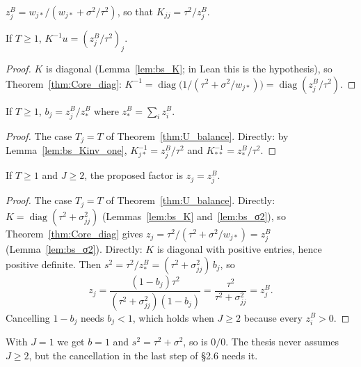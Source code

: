 \begin{definition}\label{def:bsZ}
  \leanok
  $z_j^B = w_{j*}/(w_{j*} + \sigma^2/\tau^2)$, so that
  $K_{jj} = \tau^2/z_j^B$.
\end{definition}

\begin{lemma}\label{lem:bs_Kinv_one}
  \leanok
  If $T \ge 1$, $K^{-1}u = (z_j^B/\tau^2)_j$.
\end{lemma}
\begin{proof}
  \leanok
  $K$ is diagonal (Lemma~\ref{lem:bs_K}; in Lean this is the hypothesis),
  so Theorem~\ref{thm:Core_diag}:
  $K^{-1} = \operatorname{diag}\bigl(1/(\tau^2 + \sigma^2/w_{j*})\bigr)
  = \operatorname{diag}(z_j^B/\tau^2)$.
\end{proof}

\begin{lemma}\label{lem:bs_b}
  \leanok
  If $T \ge 1$, $b_j = z_j^B/z_*^B$ where $z_*^B = \sum_i z_i^B$.
\end{lemma}
\begin{proof}
  \leanok
  The case $T_j = T$ of Theorem~\ref{thm:U_balance}. Directly: by
  Lemma~\ref{lem:bs_Kinv_one}, $K^{-1}_{j*} = z_j^B/\tau^2$
  and $K^{-1}_{**} = z_*^B/\tau^2$.
\end{proof}

\begin{theorem}\label{thm:bs_z}
  \leanok
  If $T \ge 1$ and $J \ge 2$, the proposed factor is $z_j = z_j^B$.
\end{theorem}
\begin{proof}
  \leanok
  The case $T_j = T$ of Theorem~\ref{thm:U_balance}. Directly:
  $K = \operatorname{diag}(\tau^2 + \sigma^2_{jj})$ (Lemmas~\ref{lem:bs_K}
  and~\ref{lem:bs_σ2}), so Theorem~\ref{thm:Core_diag} gives
  $z_j = \tau^2/(\tau^2 + \sigma^2/w_{j*}) = z_j^B$ (Lemma~\ref{lem:bs_σ2}).
  Directly: $K$ is diagonal with positive entries, hence positive definite. Then
  $s^2 = \tau^2/z_*^B = (\tau^2 + \sigma_{jj}^2)\,b_j$, so
  \[
    z_j = \frac{(1-b_j)\tau^2}{(\tau^2+\sigma_{jj}^2)(1-b_j)}
        = \frac{\tau^2}{\tau^2+\sigma_{jj}^2} = z_j^B .
  \]
  Cancelling $1 - b_j$ needs $b_j < 1$, which holds when $J \ge 2$
  because every $z_i^B > 0$.
\end{proof}

\begin{remark}\label{rem:two_cohorts}
  With $J = 1$ we get $b = 1$ and $s^2 = \tau^2 + \sigma^2$, so
   is $0/0$. The thesis never assumes $J \ge 2$, but the
  cancellation in the last step of §2.6 needs it.
\end{remark}

